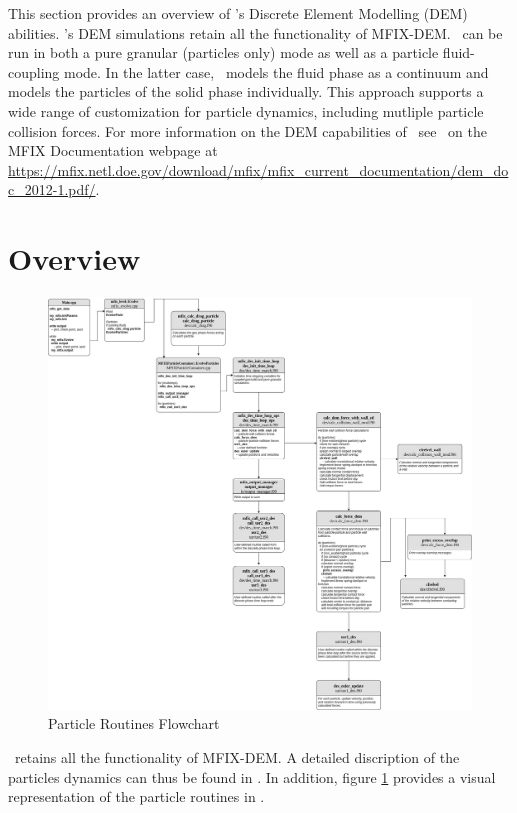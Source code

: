 This section provides an overview of \mfix's Discrete Element Modelling (DEM)
abilities. \mfix's DEM simulations retain all the functionality of MFIX-DEM. 
\mfix\ can be run in both a pure granular (particles only) mode  
as well as a particle fluid-coupling mode. In the latter case, \mfix\ models 
the fluid phase as a continuum and models the
particles of the solid phase individually. This approach supports a wide range 
of customization for particle dynamics, including mutliple particle collision 
forces. For more information on the DEM capabilities of \mfix\
see \demdoc\ on the MFIX Documentation webpage at  
{\url{https://mfix.netl.doe.gov/download/mfix/mfix_current_documentation/dem_doc_2012-1.pdf/}}.  

\section{Overview}

\begin{figure}
    \includegraphics[width=\linewidth,natwidth=800, natheight=600]{./Particles/MFIX-Particle-Diagram.png} 
    \caption{Particle Routines Flowchart}
    \label{fig:pflowchart}
\end{figure}

\mfix\ retains all the functionality of MFIX-DEM. A detailed discription of the
particles dynamics can thus be found in \demdoc.
In addition, figure \ref{fig:pflowchart} provides a visual representation
of the particle routines in \mfix. 

